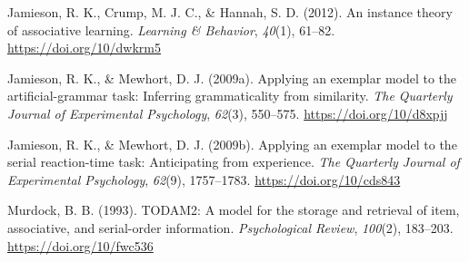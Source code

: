 \documentclass[
  english,
  man,floatsintext]{apa6}
\begin{document}
\leavevmode\hypertarget{ref-jamiesonInstanceTheoryAssociative2012}{}%
Jamieson, R. K., Crump, M. J. C., \& Hannah, S. D. (2012). An instance theory of associative learning. \emph{Learning \& Behavior}, \emph{40}(1), 61--82. \url{https://doi.org/10/dwkrm5}

\leavevmode\hypertarget{ref-jamiesonApplyingExemplarModel2009}{}%
Jamieson, R. K., \& Mewhort, D. J. (2009a). Applying an exemplar model to the artificial-grammar task: Inferring grammaticality from similarity. \emph{The Quarterly Journal of Experimental Psychology}, \emph{62}(3), 550--575. \url{https://doi.org/10/d8xpjj}

\leavevmode\hypertarget{ref-jamiesonApplyingExemplarModel2009a}{}%
Jamieson, R. K., \& Mewhort, D. J. (2009b). Applying an exemplar model to the serial reaction-time task: Anticipating from experience. \emph{The Quarterly Journal of Experimental Psychology}, \emph{62}(9), 1757--1783. \url{https://doi.org/10/cds843}

\leavevmode\hypertarget{ref-murdockTODAM2ModelStorage1993}{}%
Murdock, B. B. (1993). TODAM2: A model for the storage and retrieval of item, associative, and serial-order information. \emph{Psychological Review}, \emph{100}(2), 183--203. \url{https://doi.org/10/fwc536}

\endgroup
\end{document}

